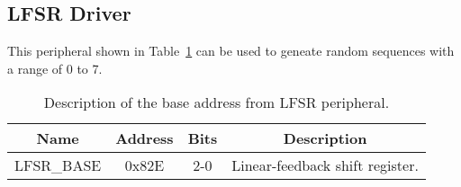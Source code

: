 \subsection{LFSR Driver}
This peripheral shown in Table~\ref{tab:LFSR} can be used to geneate random sequences with a range of 0 to 7.

\begin{table}[h]
\centering
\begin{tabular}{|l|c|c|l|}
\hline
\multicolumn{1}{|c|}{\bf Name} & {\bf Address} & {\bf Bits} & \multicolumn{1}{c|}{\bf Description} \\ 
\hline \hline
\multicolumn{1}{|l|}{LFSR\_BASE} & 0x82E & 2-0 & Linear-feedback shift register.\\ 
\hline
\end{tabular}
\caption{Description of the base address from LFSR peripheral.}
\label{tab:LFSR}
\end{table}
